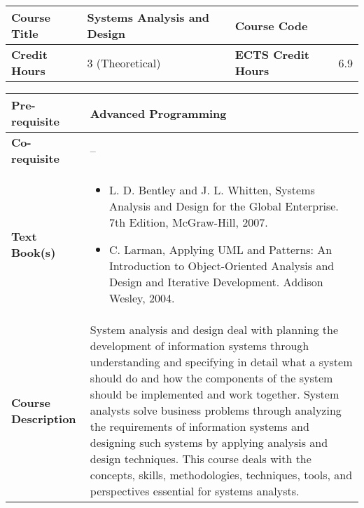 \documentclass[12pt]{article}
\begin{document}
\begin{minipage}{\textwidth}
\begin{tabularx}{\textwidth}{|l|X|l|X|}
\hline
\textbf{Course Title}       &  Systems Analysis and Design & \textbf{Course Code}       &   \\ \hline
\textbf{Credit Hours}       &  3 (Theoretical) & \textbf{ECTS Credit Hours}       &   6.9 \\ \hline
\end{tabularx}

\begin{tabularx}{\textwidth}{|l|X|}
\hline
\textbf{Pre-requisite}      &  Advanced Programming \\ \hline
\textbf{Co-requisite}       &  -- \\ \hline
\textbf{Text Book(s)}      & \begin{minipage}{.70\textwidth}
					\begin{itemize} \itemsep-0.4em
						\vspace{3mm}
						\item L. D. Bentley and J. L. Whitten, Systems Analysis and Design for the Global Enterprise. 7th Edition, McGraw-Hill, 2007.
						\item C. Larman, Applying UML and Patterns: An Introduction to Object-Oriented Analysis and Design and Iterative Development. Addison Wesley, 2004.
						\vspace{3mm}
					\end{itemize}
				\end{minipage}  \\ \hline
\textbf{Course Description} & \begin{minipage}{.70\textwidth}
					\vspace{3mm}
					System analysis and design deal with planning the development of information systems through understanding and specifying in detail what a system should do and how the components of the system should be implemented and work together. System analysts solve business problems through analyzing the requirements of information systems and designing such systems by applying analysis and design techniques. This course deals with the concepts, skills, methodologies, techniques, tools, and perspectives essential for systems analysts.

					\vspace{3mm}
					\end{minipage} \\ \hline
\end{tabularx}
\end{minipage}
\end{document}
